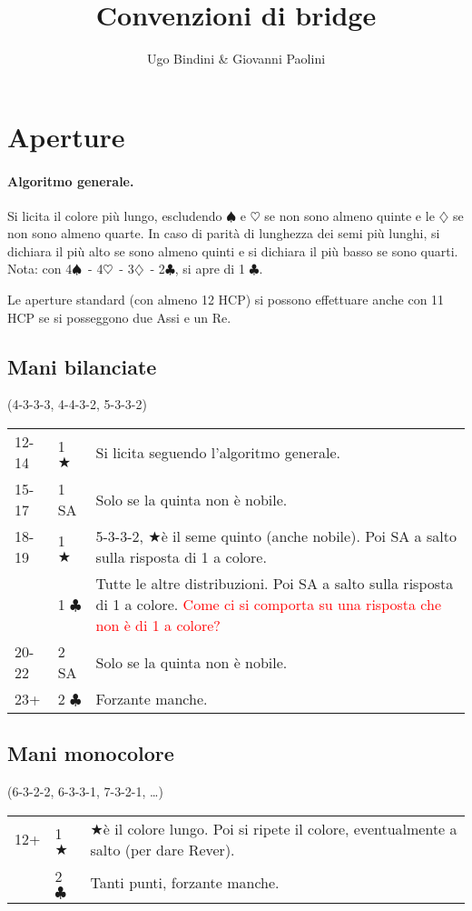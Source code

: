 \documentclass[a4paper,10pt]{article}
\title{Convenzioni di bridge}
\author{Ugo Bindini \& Giovanni Paolini}
\renewcommand{\c}{$\clubsuit$\xspace}
\renewcommand{\d}{$\diamondsuit$\xspace}
\newcommand{\h}{$\heartsuit$\xspace}
\newcommand{\s}{$\spadesuit$\xspace}
\renewcommand{\j}{$\bigstar$\xspace}
\newcommand{\sa}{SA\xspace}
\newcommand{\smallspace}{\vskip0.3cm}
\newcommand{\note}[1]{\textcolor{red}{#1}}
\newenvironment{threecol}
  {\smallspace\noindent\begin{tabular}{l l p{0.7\textwidth}}}
  {\end{tabular}\smallspace}
\begin{document}
\maketitle

\tableofcontents

\pagebreak
\section{Aperture}

\paragraph{Algoritmo generale.}
Si licita il colore pi\`u lungo, escludendo \s e \h se non sono almeno quinte e le \d se non sono almeno quarte.
In caso di parit\`a di lunghezza dei semi pi\`u lunghi, si dichiara il pi\`u alto se sono almeno quinti e si dichiara il pi\`u basso se sono quarti.
Nota: con 4\s\ - 4\h\ - 3\d\ - 2\c, si apre di 1 \c.

\noindent Le aperture standard (con almeno 12 HCP) si possono effettuare anche con 11 HCP se si posseggono due Assi e un Re.

\subsection{Mani bilanciate}
(4-3-3-3, 4-4-3-2, 5-3-3-2)
\smallspace

\begin{threecol}
 12-14 & 1 \j & Si licita seguendo l'algoritmo generale.\\
 15-17 & 1 \sa & Solo se la quinta non \`e nobile.\\
 18-19 & 1 \j & 5-3-3-2, \j \`e il seme quinto (anche nobile). Poi \sa a salto sulla risposta di 1 a colore.\\
       & 1 \c & Tutte le altre distribuzioni. Poi \sa a salto sulla risposta di 1 a colore. \note{Come ci si comporta su una risposta che non è di 1 a colore?}\\
 20-22 & 2 \sa & Solo se la quinta non è nobile.\\
 23+ & 2 \c & Forzante manche.
\end{threecol}


\subsection{Mani monocolore}
(6-3-2-2, 6-3-3-1, 7-3-2-1, \dots)

\begin{threecol}
 12+ & 1 \j & \j \`e il colore lungo. Poi si ripete il colore, eventualmente a salto (per dare Rever).\\
 & 2 \c & Tanti punti, forzante manche.
\end{threecol}
\end{document}
